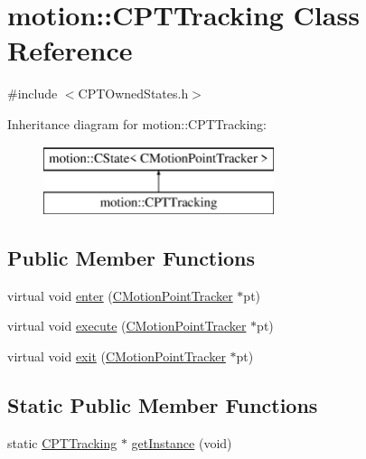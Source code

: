 \hypertarget{classmotion_1_1CPTTracking}{}\section{motion\+:\+:C\+P\+T\+Tracking Class Reference}
\label{classmotion_1_1CPTTracking}


{\ttfamily \#include $<$C\+P\+T\+Owned\+States.\+h$>$}

Inheritance diagram for motion\+:\+:C\+P\+T\+Tracking\+:\begin{figure}[H]
\begin{center}
\leavevmode
\includegraphics[height=2.000000cm]{classmotion_1_1CPTTracking}
\end{center}
\end{figure}
\subsection*{Public Member Functions}
\begin{DoxyCompactItemize}
\item 
virtual void \mbox{\hyperlink{classmotion_1_1CPTTracking_af2456aaf125ca9ba240463d1e259d4b9}{enter}} (\mbox{\hyperlink{classmotion_1_1CMotionPointTracker}{C\+Motion\+Point\+Tracker}} $\ast$pt)
\item 
virtual void \mbox{\hyperlink{classmotion_1_1CPTTracking_aa8f85da75436cc8d98c25318b0bea42d}{execute}} (\mbox{\hyperlink{classmotion_1_1CMotionPointTracker}{C\+Motion\+Point\+Tracker}} $\ast$pt)
\item 
virtual void \mbox{\hyperlink{classmotion_1_1CPTTracking_aa7a6294200e0dd2c0d53f852558d7d89}{exit}} (\mbox{\hyperlink{classmotion_1_1CMotionPointTracker}{C\+Motion\+Point\+Tracker}} $\ast$pt)
\end{DoxyCompactItemize}
\subsection*{Static Public Member Functions}
\begin{DoxyCompactItemize}
\item 
static \mbox{\hyperlink{classmotion_1_1CPTTracking}{C\+P\+T\+Tracking}} $\ast$ \mbox{\hyperlink{classmotion_1_1CPTTracking_a46a7c1bd0b68ce1c273ae32a75d76506}{get\+Instance}} (void)
\end{DoxyCompactItemize}


